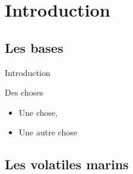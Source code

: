 \documentclass[10pt,a4paper]{beamer}
\author{Ludovic}
\begin{document}
\section{Introduction}
\subsection{Les bases}

\begin{frame}{Introduction}
  \begin{block}{Des choses}
    \begin{itemize}
    \item Une chose,
    \pause
    \item Une autre chose
    \end{itemize}
  \end{block}
\end{frame}

\subsection{Les volatiles marins}
\end{document}
